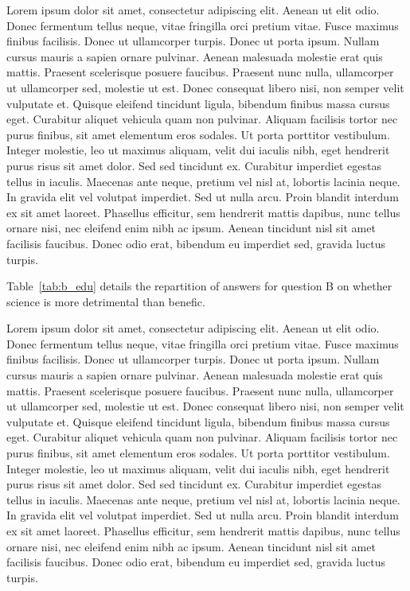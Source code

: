 \documentclass[Afour,times,sageh]{sagej}
\begin{document}
Lorem ipsum dolor sit amet, consectetur adipiscing elit. Aenean ut elit
odio. Donec fermentum tellus neque, vitae fringilla orci pretium vitae.
Fusce maximus finibus facilisis. Donec ut ullamcorper turpis. Donec ut
porta ipsum. Nullam cursus mauris a sapien ornare pulvinar. Aenean
malesuada molestie erat quis mattis. Praesent scelerisque posuere
faucibus. Praesent nunc nulla, ullamcorper ut ullamcorper sed, molestie
ut est. Donec consequat libero nisi, non semper velit vulputate et.
Quisque eleifend tincidunt ligula, bibendum finibus massa cursus eget.
Curabitur aliquet vehicula quam non pulvinar. Aliquam facilisis tortor
nec purus finibus, sit amet elementum eros sodales. Ut porta porttitor
vestibulum. Integer molestie, leo ut maximus aliquam, velit dui iaculis
nibh, eget hendrerit purus risus sit amet dolor. Sed sed tincidunt ex.
Curabitur imperdiet egestas tellus in iaculis. Maecenas ante neque,
pretium vel nisl at, lobortis lacinia neque. In gravida elit vel
volutpat imperdiet. Sed ut nulla arcu. Proin blandit interdum ex sit
amet laoreet. Phasellus efficitur, sem hendrerit mattis dapibus, nunc
tellus ornare nisi, nec eleifend enim nibh ac ipsum. Aenean tincidunt
nisl sit amet facilisis faucibus. Donec odio erat, bibendum eu imperdiet
sed, gravida luctus turpis.

Table~\ref{tab:b_edu} details the repartition of answers for question B
on whether science is more detrimental than benefic.

Lorem ipsum dolor sit amet, consectetur adipiscing elit. Aenean ut elit
odio. Donec fermentum tellus neque, vitae fringilla orci pretium vitae.
Fusce maximus finibus facilisis. Donec ut ullamcorper turpis. Donec ut
porta ipsum. Nullam cursus mauris a sapien ornare pulvinar. Aenean
malesuada molestie erat quis mattis. Praesent scelerisque posuere
faucibus. Praesent nunc nulla, ullamcorper ut ullamcorper sed, molestie
ut est. Donec consequat libero nisi, non semper velit vulputate et.
Quisque eleifend tincidunt ligula, bibendum finibus massa cursus eget.
Curabitur aliquet vehicula quam non pulvinar. Aliquam facilisis tortor
nec purus finibus, sit amet elementum eros sodales. Ut porta porttitor
vestibulum. Integer molestie, leo ut maximus aliquam, velit dui iaculis
nibh, eget hendrerit purus risus sit amet dolor. Sed sed tincidunt ex.
Curabitur imperdiet egestas tellus in iaculis. Maecenas ante neque,
pretium vel nisl at, lobortis lacinia neque. In gravida elit vel
volutpat imperdiet. Sed ut nulla arcu. Proin blandit interdum ex sit
amet laoreet. Phasellus efficitur, sem hendrerit mattis dapibus, nunc
tellus ornare nisi, nec eleifend enim nibh ac ipsum. Aenean tincidunt
nisl sit amet facilisis faucibus. Donec odio erat, bibendum eu imperdiet
sed, gravida luctus turpis.
\end{document}
